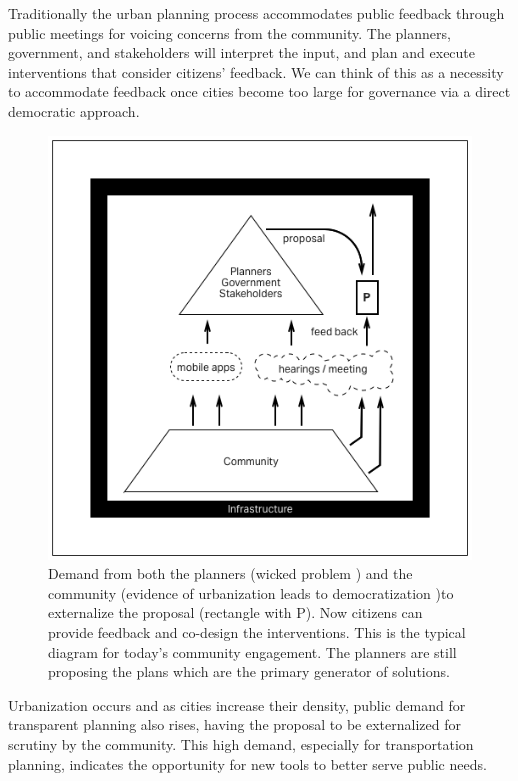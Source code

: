 Traditionally the urban planning process accommodates public feedback through public meetings for voicing concerns from the community.  The planners, government, and stakeholders will interpret the input, and plan and execute interventions that consider citizens' feedback. We can think of this as a necessity to accommodate feedback once cities become too large for governance via a direct democratic approach.
\begin{figure}[!htb]
 	\includegraphics[width=\textwidth]{chapters/1/fig/community_engagement.png}               
 	 \caption[externalized proposal]{Demand from both the planners (wicked problem \cite{churchman1967guest}) and the community (evidence of urbanization leads to democratization \cite{woolley2010evidence})to externalize the proposal (rectangle with P). Now citizens can provide feedback and co-design the interventions. This
is the typical diagram for today's community engagement. The planners are still proposing the plans which are the primary generator of solutions.
}
  	\label{fig:spin_margin}
\end{figure}
Urbanization occurs and as cities increase their density, public demand for transparent planning also rises, having the proposal to be externalized for scrutiny by the community. This high demand, especially for transportation planning, indicates the opportunity for new tools to better serve public needs.

